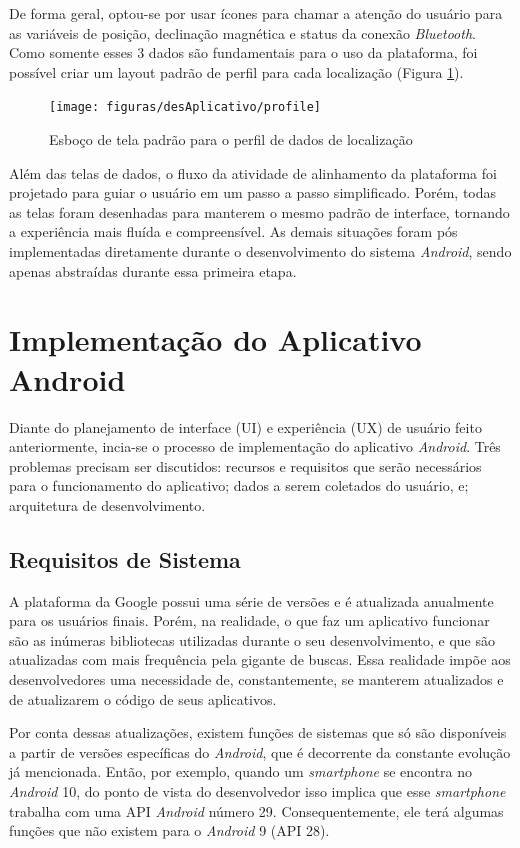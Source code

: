 De forma geral, optou-se por usar ícones para chamar a atenção do usuário para as variáveis de posição, declinação magnética e status da conexão \textit{Bluetooth}. Como somente esses 3 dados são fundamentais para o uso da plataforma, foi possível criar um layout padrão de perfil para cada localização (Figura \ref{fig:layoutpadraoperfil}). 

\begin{figure}[!htb]
	\centering
	\caption{Esboço de tela padrão para o perfil de dados de localização}
	\texttt{[image: figuras/desAplicativo/profile]}
	\label{fig:layoutpadraoperfil}
\end{figure}

Além das telas de dados, o fluxo da atividade de alinhamento da plataforma foi projetado para guiar o usuário em um passo a passo simplificado. Porém, todas as telas foram desenhadas para manterem o mesmo padrão de interface, tornando a experiência mais fluída e compreensível. As demais situações foram pós implementadas diretamente durante o desenvolvimento do sistema \textit{Android}, sendo apenas abstraídas durante essa primeira etapa.

\section{Implementação do Aplicativo Android}

Diante do planejamento de interface (UI) e experiência (UX) de usuário feito anteriormente, incia-se o processo de implementação do aplicativo \textit{Android}. Três problemas precisam ser discutidos: recursos e requisitos que serão necessários para o funcionamento do aplicativo; dados a serem coletados do usuário, e; arquitetura de desenvolvimento.

\subsection{Requisitos de Sistema}

A plataforma da Google possui uma série de versões e é atualizada anualmente para os usuários finais. Porém, na realidade, o que faz um aplicativo funcionar são as inúmeras bibliotecas utilizadas durante o seu desenvolvimento, e que são atualizadas com mais frequência pela gigante de buscas. Essa realidade impõe aos desenvolvedores uma necessidade de, constantemente, se manterem atualizados e de atualizarem o código de seus aplicativos. 

Por conta dessas atualizações, existem funções de sistemas que só são disponíveis a partir de versões específicas do \textit{Android}, que é decorrente da constante evolução já mencionada. Então, por exemplo, quando um \textit{smartphone} se encontra no \textit{Android} 10, do ponto de vista do desenvolvedor isso implica que esse \textit{smartphone} trabalha com uma API \textit{Android} número 29. Consequentemente, ele terá algumas funções que não existem para o \textit{Android} 9 (API 28).

